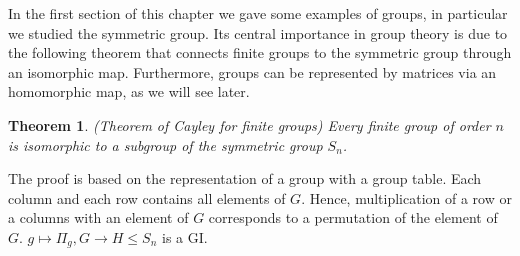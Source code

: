 \documentclass[12pt]{book}
\theoremstyle{plain}
\newtheorem{thm}{Theorem}[section]
\theoremstyle{definition}
\theoremstyle{remark}
\begin{document}
In the first section of this chapter we gave some examples of groups, in particular we studied the symmetric group. Its central importance in group theory is due to the following theorem that connects finite groups to the symmetric group through an isomorphic map. Furthermore, groups can be represented by matrices via an homomorphic map, as we will see later.
\begin{thm}
(Theorem of Cayley for finite groups) Every finite group of order $n$ is isomorphic to a subgroup of the symmetric group $S_n$.
\end{thm}
The proof is based on the representation of a group with a group table. Each column and each row contains all elements of $G$. Hence, multiplication of a row or a columns with an element of $G$ corresponds to a permutation of the element of $G$. $g\mapsto \Pi_g, G\to H\leq S_n$ is a GI.
\end{document}

